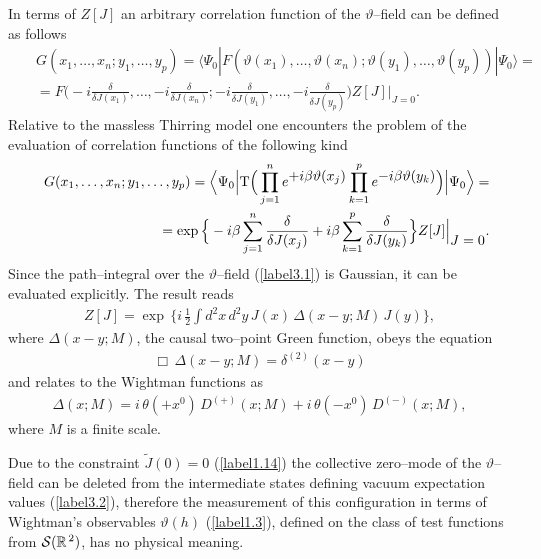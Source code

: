 \documentclass[a4paper,12pt] {article}
\begin{document}
In terms of $Z[J]$ an arbitrary correlation function of the
$\vartheta$--field can be defined as follows
%
\begin{eqnarray}\label{label3.2}
&&G(x_1,\ldots,x_n;y_1,\ldots,y_p) = \langle
\Psi_0|F(\vartheta(x_1),\ldots,\vartheta(x_n);\vartheta(y_1),\ldots,
\vartheta(y_p))|\Psi_0\rangle = \nonumber\\ &&=
F\Big(-i\frac{\delta}{\delta J(x_1)},\ldots,-i\frac{\delta}{\delta
J(x_n)};- i\frac{\delta}{\delta J(y_1)},\ldots,-i\frac{\delta}{\delta
J(y_p)}\Big)Z[J]\Big|_{\textstyle J = 0}.
\end{eqnarray}
%
Relative to the massless Thirring model one encounters the problem of
the evaluation of correlation functions of the following kind
%
\begin{eqnarray}\label{label3.3}
&&G(x_1,\ldots,x_n;y_1,\ldots,y_p) = \Big\langle \Psi_0\Big|{\rm
T}\Big(\prod^n_{j=1}e^{\textstyle +
i\beta\vartheta(x_j)}\prod^p_{k=1}e^{\textstyle
-i\beta\vartheta(y_k)}\Big)\Big|\Psi_0\Big\rangle=\nonumber\\
&&=\exp\Big\{-i\beta\sum^n_{j = 1}\frac{\delta}{\delta J(x_j)} +
i\beta\sum^p_{k = 1}\frac{\delta}{\delta
J(y_k)}\Big\}Z[J]\Big|_{\textstyle J = 0}.
\end{eqnarray}
%
Since the path--integral over the $\vartheta$--field (\ref{label3.1})
is Gaussian, it can be evaluated explicitly. The result reads
%
\begin{eqnarray}\label{label3.4}
Z[J] = \exp\,\Big\{i\,\frac{1}{2}\int
d^2x\,d^2y\,J(x)\,\Delta(x-y; M)\,J(y)\Big\},
\end{eqnarray}
%
where $\Delta(x-y;M)$, the causal two--point Green function, obeys
the equation
%
\begin{eqnarray}\label{label3.5}
\Box\,\Delta(x-y;M) = \delta^{(2)}(x-y)
\end{eqnarray}
%
and relates to the Wightman functions as 
%
\begin{eqnarray}\label{label3.6}
\Delta(x;M) = i\,\theta(+ x^0)\,D^{(+)}(x; M) +
i\,\theta(-x^0)\,D^{(-)}(x; M),
\end{eqnarray}
%
where $M$ is a finite scale.

Due to the constraint $\tilde{J}(0) = 0$ (\ref{label1.14}) the
collective zero--mode of the $\vartheta$--field can be deleted from
the intermediate states defining vacuum expectation values
(\ref{label3.2}), therefore the measurement of this configuration in
terms of Wightman's observables $\vartheta(h)$ (\ref{label1.3}),
defined on the class of test functions from ${\cal
S}(\mathbb{R}^{\,2})$, has no physical meaning.
\end{document}
